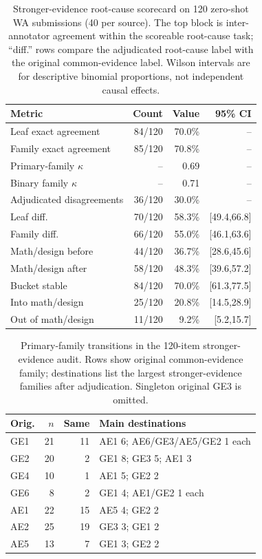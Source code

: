 \documentclass[conference]{IEEEtran}
\begin{document}
\begin{table}[t]
\centering
\caption{Stronger-evidence root-cause scorecard on 120 zero-shot WA submissions (40
per source). The top block is inter-annotator agreement within the scoreable
root-cause task; ``diff.'' rows compare the adjudicated root-cause label with the
original common-evidence label. Wilson intervals are for descriptive binomial
proportions, not independent causal effects.}
\label{tab:rootaudit}
\scriptsize
\setlength{\tabcolsep}{2pt}
\begin{tabular}{lrrr}
\toprule
Metric & Count & Value & 95\% CI\\
\midrule
Leaf exact agreement & 84/120 & 70.0\% & --\\
Family exact agreement & 85/120 & 70.8\% & --\\
Primary-family $\kappa$ & -- & 0.69 & --\\
Binary family $\kappa$ & -- & 0.71 & --\\
Adjudicated disagreements & 36/120 & 30.0\% & --\\
\midrule
Leaf diff. & 70/120 & 58.3\% & [49.4,66.8]\\
Family diff. & 66/120 & 55.0\% & [46.1,63.6]\\
\midrule
Math/design before & 44/120 & 36.7\% & [28.6,45.6]\\
Math/design after & 58/120 & 48.3\% & [39.6,57.2]\\
Bucket stable & 84/120 & 70.0\% & [61.3,77.5]\\
Into math/design & 25/120 & 20.8\% & [14.5,28.9]\\
Out of math/design & 11/120 & 9.2\% & [5.2,15.7]\\
\bottomrule
\end{tabular}
\end{table}

\begin{table}[t]
\centering
\caption{Primary-family transitions in the 120-item stronger-evidence audit. Rows
show original common-evidence family; destinations list the largest stronger-evidence
families after adjudication. Singleton original GE3 is omitted.}
\label{tab:audittrans}
\scriptsize
\setlength{\tabcolsep}{3pt}
\begin{tabular}{lrrp{}}
\toprule
Orig. & $n$ & Same & Main destinations\\
\midrule
GE1 & 21 & 11 & AE1 6; AE6/GE3/AE5/GE2 1 each\\
GE2 & 20 & 2 & GE1 8; GE3 5; AE1 3\\
GE4 & 10 & 1 & AE1 5; GE2 2\\
GE6 & 8 & 2 & GE1 4; AE1/GE2 1 each\\
AE1 & 22 & 15 & AE5 4; GE2 2\\
AE2 & 25 & 19 & GE3 3; GE1 2\\
AE5 & 13 & 7 & GE1 3; GE2 2\\
\bottomrule
\end{tabular}
\end{table}
\end{document}
